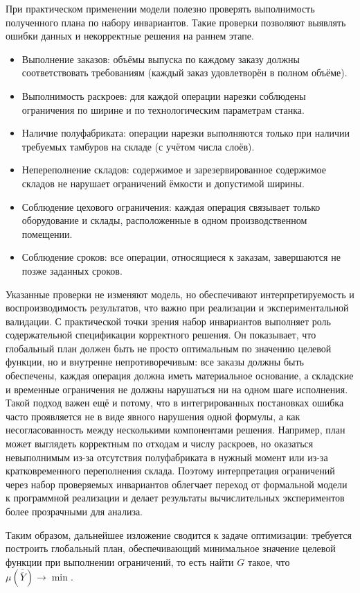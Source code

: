 При практическом применении модели полезно проверять выполнимость полученного плана по набору инвариантов.
Такие проверки позволяют выявлять ошибки данных и некорректные решения на раннем этапе.
\begin{itemize}
    \item Выполнение заказов: объёмы выпуска по каждому заказу должны соответствовать требованиям (каждый заказ удовлетворён в полном объёме).
    \item Выполнимость раскроев: для каждой операции нарезки соблюдены ограничения по ширине и по технологическим параметрам станка.
    \item Наличие полуфабриката: операции нарезки выполняются только при наличии требуемых тамбуров на складе (с учётом числа слоёв).
    \item Непереполнение складов: содержимое и зарезервированное содержимое складов не нарушает ограничений ёмкости и допустимой ширины.
    \item Соблюдение цехового ограничения: каждая операция связывает только оборудование и склады, расположенные в одном производственном помещении.
    \item Соблюдение сроков: все операции, относящиеся к заказам, завершаются не позже заданных сроков.
\end{itemize}
Указанные проверки не изменяют модель, но обеспечивают интерпретируемость и воспроизводимость результатов, что важно при реализации и экспериментальной валидации. С практической точки зрения набор инвариантов выполняет роль содержательной спецификации корректного решения. Он показывает, что глобальный план должен быть не просто оптимальным по значению целевой функции, но и внутренне непротиворечивым: все заказы должны быть обеспечены, каждая операция должна иметь материальное основание, а складские и временные ограничения не должны нарушаться ни на одном шаге исполнения.
Такой подход важен ещё и потому, что в интегрированных постановках ошибка часто проявляется не в виде явного нарушения одной формулы, а как несогласованность между несколькими компонентами решения. Например, план может выглядеть корректным по отходам и числу раскроев, но оказаться невыполнимым из-за отсутствия полуфабриката в нужный момент или из-за кратковременного переполнения склада. Поэтому интерпретация ограничений через набор проверяемых инвариантов облегчает переход от формальной модели к программной реализации и делает результаты вычислительных экспериментов более прозрачными для анализа.

Таким образом, дальнейшее изложение сводится к задаче оптимизации: требуется построить глобальный план, обеспечивающий минимальное значение целевой функции при выполнении ограничений, то есть найти $G$ такое, что $\mu(\overline{\overline{Y}}) \rightarrow \min$.

